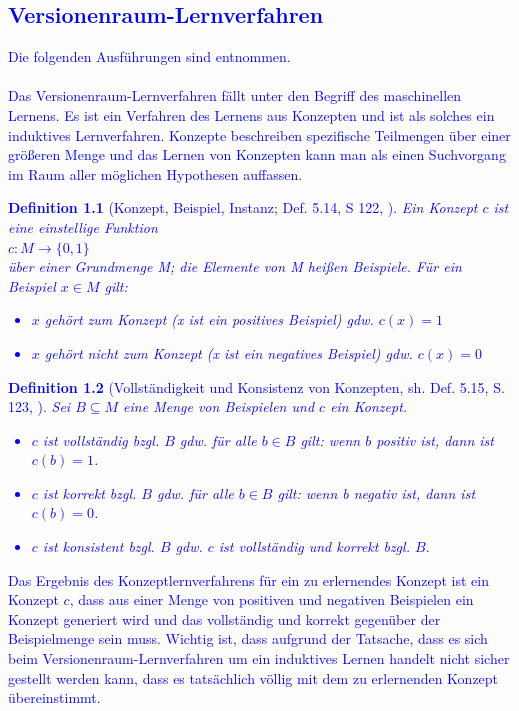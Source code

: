\documentclass[a4paper, 11pt]{book}
\newtheorem{Def}{Definition }[section]
\begin{document}
\textcolor{blue}{
	\chapter{Versionenraum-Lernverfahren} \label{VRL} 
	Die folgenden Ausführungen sind \cite{BKI08} entnommen.\\
	\\
	 Das Versionenraum-Lernverfahren fällt unter den Begriff des maschinellen Lernens. Es ist ein Verfahren des Lernens aus Konzepten und ist als solches ein induktives Lernverfahren. Konzepte beschreiben spezifische Teilmengen über einer größeren Menge und das Lernen von Konzepten kann man als einen Suchvorgang im Raum aller möglichen Hypothesen auffassen. 
	\begin{Def}[Konzept, Beispiel, Instanz; Def. 5.14, S 122, \cite{BKI08}]
		Ein Konzept $ c $ ist eine einstellige Funktion\\
		\hspace{2cm} $ c: M \rightarrow \{0,1\} $\\	
		über einer Grundmenge M; die Elemente von M heißen Beispiele. Für ein Beispiel $ x \in M $ gilt:\\
		\begin{itemize}
			\item $ x $ gehört zum Konzept (x ist ein positives Beispiel) gdw. $ c(x) = 1 $
			\item $ x $ gehört nicht zum Konzept (x ist ein negatives Beispiel) gdw. $ c(x) = 0 $
		\end{itemize}
	\end{Def}
\begin{Def}[Vollständigkeit und Konsistenz von Konzepten, sh. Def. 5.15, S. 123, \cite{BKI08}]
	Sei $ B \subseteq M $ eine Menge von Beispielen und $ c $ ein Konzept.
	\begin{itemize}
		\item $ c $ ist vollständig bzgl. $ B $ gdw. für alle $ b \in B $ gilt: wenn $ b $ positiv ist, dann ist $ c(b) = 1 $.
		\item $ c $ ist korrekt bzgl. $ B $ gdw. für alle $ b \in B $ gilt: wenn b negativ ist, dann ist $ c(b) = 0 $.
		\item $ c $ ist konsistent bzgl. $ B $ gdw. $ c $ ist vollständig und korrekt bzgl. $ B $. 
	\end{itemize}
\end{Def}
Das Ergebnis des Konzeptlernverfahrens für ein zu erlernendes Konzept ist ein Konzept $ c $, dass aus einer Menge von positiven und negativen Beispielen ein Konzept generiert wird und das vollständig und korrekt gegenüber der Beispielmenge sein muss. Wichtig ist, dass aufgrund der Tatsache, dass es sich beim Versionenraum-Lernverfahren um ein induktives Lernen handelt nicht sicher gestellt werden kann, dass es tatsächlich völlig mit dem zu erlernenden Konzept übereinstimmt.
}
\end{document}
